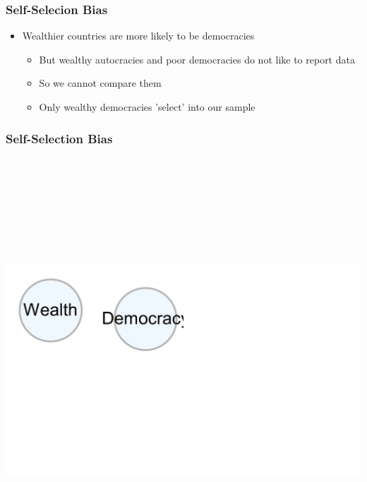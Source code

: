 \documentclass[xcolor=x11names,compress]{beamer}\usepackage[]{graphicx}\usepackage[]{color}
\newenvironment{knitrout}{}{} %
\renewcommand{\(}{\begin{columns}}
\renewcommand{\)}{\end{columns}}
\newcommand{\<}[1]{\begin{column}{#1}}
\renewcommand{\>}{\end{column}}
\begin{document}
\begin{frame}
\frametitle{Self-Selecion Bias}
\begin{itemize}
\item Wealthier countries are more likely to be democracies
\pause
\begin{itemize}
\item But wealthy autocracies and poor democracies do not like to report data
\pause
\item So we cannot compare them
\pause
\item Only wealthy democracies 'select' into our sample
\end{itemize}
\end{itemize}
\end{frame}



\begin{frame}
\frametitle{Self-Selection Bias}
\begin{knitrout}
\color{fgcolor}

{\centering \includegraphics[width=600,height=600]{figure/unnamed-chunk-3-1} 

}



\end{knitrout}
\end{frame}
\end{document}
